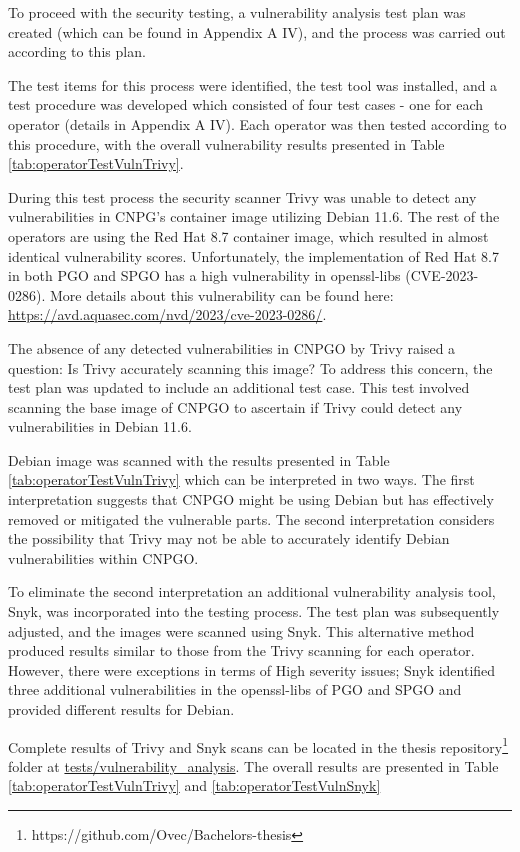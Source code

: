 To proceed with the security testing, a vulnerability analysis test plan was created (which can be found in Appendix A IV), and the process was carried out according to this plan.

The test items for this process were identified, the test tool was installed, and a test procedure was developed which consisted of four test cases - one for each operator (details in Appendix A IV).
Each operator was then tested according to this procedure, with the overall vulnerability results presented in Table \ref{tab:operatorTestVulnTrivy}.

During this test process the security scanner Trivy was unable to detect any vulnerabilities in CNPG's container image utilizing Debian 11.6.
The rest of the operators are using the Red Hat 8.7 container image, which resulted in almost identical vulnerability scores.
Unfortunately, the implementation of Red Hat 8.7 in both PGO and SPGO has a high vulnerability in openssl-libs (CVE-2023-0286).
More details about this vulnerability can be found here: \url{https://avd.aquasec.com/nvd/2023/cve-2023-0286/}.

The absence of any detected vulnerabilities in CNPGO by Trivy raised a question: Is Trivy accurately scanning this image? To address this concern, the test plan was updated to include an additional test case.
This test involved scanning the base image of CNPGO to ascertain if Trivy could detect any vulnerabilities in Debian 11.6.

Debian image was scanned with the results presented in Table \ref{tab:operatorTestVulnTrivy} which can be interpreted in two ways. The first interpretation suggests that CNPGO might be using Debian but has effectively removed or mitigated the vulnerable parts. The second interpretation considers the possibility that Trivy may not be able to accurately identify Debian vulnerabilities within CNPGO.

To eliminate the second interpretation an additional vulnerability analysis tool, Snyk, was incorporated into the testing process. The test plan was subsequently adjusted, and the images were scanned using Snyk. This alternative method produced results similar to those from the Trivy scanning for each operator. However, there were exceptions in terms of High severity issues;
Snyk identified three additional vulnerabilities in the openssl-libs of PGO and SPGO and provided different results for Debian.

Complete results of Trivy and Snyk scans can be located in the thesis repository\footnote[6]{https://github.com/Ovec/Bachelors-thesis} folder at \url{tests/vulnerability_analysis}. The overall results are presented in Table \ref{tab:operatorTestVulnTrivy} and \ref{tab:operatorTestVulnSnyk}

